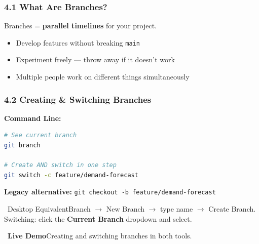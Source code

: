 \documentclass{beamer}
\newcommand{\livedemo}[1]{\begin{alertblock}{\faDesktop\ \textbf{Live Demo}}#1\end{alertblock}}
\newcommand{\desktoptip}[1]{\begin{block}{\faMousePointer\ Desktop Equivalent}#1\end{block}}
\begin{document}
\begin{frame}
\frametitle{4.1 What Are Branches?}

Branches = \textbf{parallel timelines} for your project.

\begin{center}
\end{center}

\vspace{4mm}
\begin{itemize}
    \item Develop features without breaking \texttt{main}
    \item Experiment freely --- throw away if it doesn't work
    \item Multiple people work on different things simultaneously
\end{itemize}
\end{frame}

\begin{frame}[fragile]
\frametitle{4.2 Creating \& Switching Branches}

\textbf{Command Line:}
\begin{lstlisting}[language=bash]
# See current branch
git branch

# Create AND switch in one step
git switch -c feature/demand-forecast
\end{lstlisting}

\textbf{Legacy alternative:} \texttt{git checkout -b feature/demand-forecast}

\desktoptip{Branch $\rightarrow$ New Branch $\rightarrow$ type name $\rightarrow$ Create Branch. Switching: click the \textbf{Current Branch} dropdown and select.}

\livedemo{Creating and switching branches in both tools.}
\end{frame}
\end{document}

